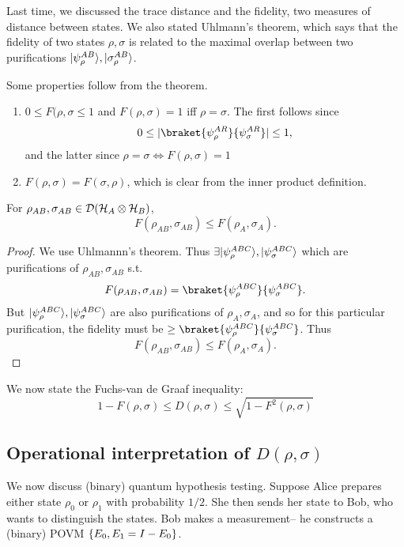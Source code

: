 Last time, we discussed the trace distance and the fidelity, two measures of distance between states. We also stated Uhlmann's theorem, which says that the fidelity of two states $\rho,\sigma$ is related to the maximal overlap between two purifications $\lvert\psi_\rho^{AB}\rangle,\lvert\sigma_\rho^{AB}\rangle$.

Some properties follow from the theorem.
\begin{enumerate}
    \item $0\leq F(\rho,\sigma \leq 1$ and $F(\rho,\sigma)=1$ iff $\rho=\sigma$. The first follows since
    \begin{equation*}
        0\leq \abs{\braket{\psi_\rho^{AR}}
        {\psi_\sigma^{AR}}} \leq 1,
    \end{equation*}
    and the latter since $\rho=\sigma \iff F(\rho,\sigma)=1$
    \item $F(\rho,\sigma)=F(\sigma,\rho)$, which is clear from the inner product definition.
\end{enumerate}
\begin{lem}
    For $\rho_{AB},\sigma_{AB}\in \mathcal{D}(\mathcal H_A\otimes \mathcal H_B)$,
    \begin{equation}
        F(\rho_{AB},\sigma_{AB})\leq F(\rho_A,\sigma_A).
    \end{equation}
\end{lem}
\begin{proof}
    We use Uhlmannn's theorem. Thus $\exists \lvert\psi_\rho^{ABC}\rangle,\lvert\psi_\sigma^{ABC}\rangle$ which are purifications of $\rho_{AB},\sigma_{AB}$ s.t.
    \begin{equation}
        F(\rho_{AB},\sigma_{AB}) =\braket{\psi_\rho^{ABC}}{\psi_\sigma^{ABC}}.
    \end{equation}
    But $\lvert\psi_\rho^{ABC}\rangle,\lvert\psi_\sigma^{ABC}\rangle$ are also purifications of $\rho_A,\sigma_A$, and so for this particular purification, the fidelity must be $\geq \braket{\psi_\rho^{ABC}}{\psi_\sigma^{ABC}}$. Thus
    \begin{equation}
        F(\rho_{AB},\sigma_{AB}) \leq F(\rho_A,\sigma_A).
    \end{equation}
\end{proof}

We now state the Fuchs-van de Graaf inequality:
\begin{equation}
    1-F(\rho,\sigma)\leq D(\rho,\sigma) \leq \sqrt{1-F^2(\rho,\sigma)}
\end{equation}

\subsection*{Operational interpretation of $D(\rho,\sigma)$}
We now discuss (binary) quantum hypothesis testing. Suppose Alice prepares either state $\rho_0$ or $\rho_1$ with probability $1/2$. She then sends her state to Bob, who wants to distinguish the states. Bob makes a measurement-- he constructs a (binary) POVM $\{E_0,E_1=I-E_0\}$.

